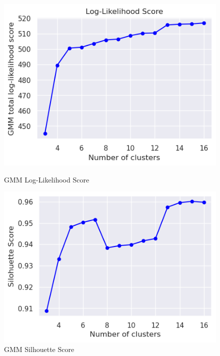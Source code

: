        
        \begin{figure}[h]
            \centering
            \begin{minipage}[c]{0.47\textwidth}
                \centering
                \includegraphics[width=\textwidth]{../figures/plots/section3/gmm_total_log-likelihood_score.png}
                \caption{GMM Log-Likelihood Score}
                \label{fig:tsne_kmeans}
            \end{minipage}
            \hfill
            \begin{minipage}[c]{0.47\textwidth}
                \centering
                \includegraphics[width=\textwidth]{../figures/plots/section3/gmm_silohuette_score.png}
                \caption{GMM Silhouette Score}
                \label{fig:tsne_gmm}
            \end{minipage}
        \end{figure}

